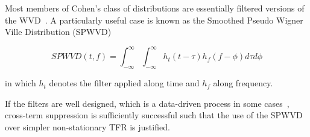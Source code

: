 Most members of Cohen's class of distributions are essentially filtered
versions of the WVD~\cite{}. A particularly useful case is known as the
Smoothed Pseudo Wigner Ville Distribution (SPWVD)

$$ SPWVD(t, f) = \int_{-\infty}^{\infty}\int_{-\infty}^{\infty} h_t (t - \tau) h_f(f - \phi)d\tau d\phi$$

in which $h_t$ denotes the filter applied along time and $h_f$ along frequency.

If the filters are well designed, which is a data-driven process in some
cases~\cite{}, cross-term suppression is sufficiently successful such that
the use of the SPWVD over simpler non-stationary TFR is justified.
